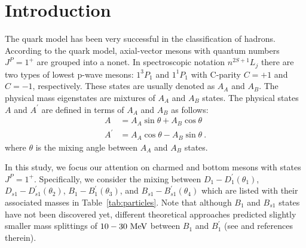 \documentclass[prd,a4paper,preprint,preprintnumbers,nofootinbib,superscriptaddress]{revtex4-2}
\begin{document}


\section{Introduction}
\label{intro}
% 
 The quark model has been very successful in the classification of hadrons. According to the quark model, axial-vector mesons with quantum numbers $J^P=1^+$ are grouped into a nonet. In spectroscopic notation $n ^{2S+1} L_j$ there are two types of lowest p-wave mesons: $1^{3} P_1$ and $1^{1}P_1$ with C-parity $C=+1$ and $C=-1$, respectively. These states are usually denoted as $A_A$ and $A_B$. The physical mass eigenstates are mixtures of $A_A$ and $A_B$ states. The physical states $A$ and $A^\prime$ are defined in terms of $A_A$ and $A_B$ as follows:
 \begin{equation}
   \label{eq:1}
   \begin{split}
     A &= A_A \sin{\theta} + A_B \cos{\theta}  \\
     A^\prime &= A_A \cos{\theta} - A_B \sin{\theta}~.        
   \end{split}
 \end{equation}
%
 where $\theta$ is the mixing angle between $A_A$ and $A_B$ states.

 
 In this study, we focus our attention on charmed and bottom mesons with states $J^P = 1^+ $. Specifically, we consider the mixing between $D_1 - D_1^\prime (\theta_1)$, $D_{s1} - D_{s1}^\prime (\theta_2)$, $B_1 - B_1^\prime (\theta_3)$, and $B_{s1} - B_{s1}^\prime (\theta_4)$ which are listed with their associated masses in Table~\ref{tab:particles}. Note that although \(B_1\) and \(B_{s1}\) states have not been discovered yet, different theoretical approaches predicted slightly smaller mass splittings of $10 - 30~\rm{MeV}$ between $B_1$ and $B_1^\prime$ (see \cite{li:2021hss} and references therein).  
\end{document}
